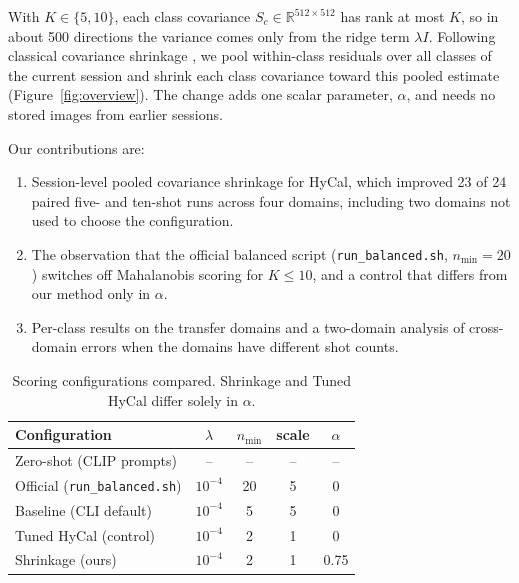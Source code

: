 \documentclass[letterpaper]{article} %
\newcommand{\nmin}{n_{\min}}
\begin{document}
With $K \in \{5, 10\}$, each class covariance $S_c \in \mathbb{R}^{512 \times 512}$ has rank at most $K$, so in about 500 directions the variance comes only from the ridge term $\lambda I$. Following classical covariance shrinkage \citep{friedman1989,ledoit2004}, we pool within-class residuals over all classes of the current session and shrink each class covariance toward this pooled estimate (Figure~\ref{fig:overview}). The change adds one scalar parameter, $\alpha$, and needs no stored images from earlier sessions.

Our contributions are:
\begin{enumerate}
\item Session-level pooled covariance shrinkage for HyCal, which improved 23 of 24 paired five- and ten-shot runs across four domains, including two domains not used to choose the configuration.
\item The observation that the official balanced script (\texttt{run\_balanced.sh}, $\nmin = 20$) switches off Mahalanobis scoring for $K \le 10$, and a control that differs from our method only in $\alpha$.
\item Per-class results on the transfer domains and a two-domain analysis of cross-domain errors when the domains have different shot counts.
\end{enumerate}


\begin{table}[t]
\centering
\small
\setlength{\tabcolsep}{4pt}
\begin{tabular}{@{}lcccc@{}}
\toprule
Configuration & $\lambda$ & $\nmin$ & scale & $\alpha$ \\
\midrule
Zero-shot (CLIP prompts) & -- & -- & -- & -- \\
Official (\texttt{run\_balanced.sh}) & $10^{-4}$ & 20 & 5 & 0 \\
Baseline (CLI default) & $10^{-4}$ & 5 & 5 & 0 \\
Tuned HyCal (control) & $10^{-4}$ & 2 & 1 & 0 \\
Shrinkage (ours) & $10^{-4}$ & 2 & 1 & 0.75 \\
\bottomrule
\end{tabular}
\caption{Scoring configurations compared. Shrinkage and Tuned HyCal differ solely in $\alpha$.}
\label{tab:configs}
\end{table}
\end{document}
